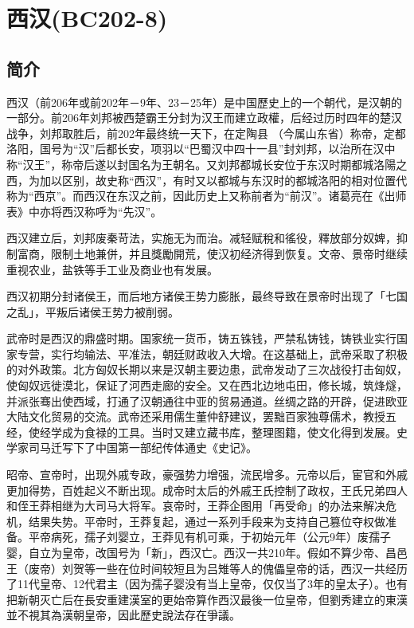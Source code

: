 
\chapter{西汉\tiny(BC202-8)}

\section{简介}


西汉（前206年或前202年－9年、23－25年）是中国歷史上的一个朝代，是汉朝的一部分。前206年刘邦被西楚霸王分封为汉王而建立政權，后经过历时四年的楚汉战争，刘邦取胜后，前202年最终统一天下，在定陶县 （今属山东省）称帝，定都洛阳，国号为“汉”后都长安，项羽以“巴蜀汉中四十一县”封刘邦，以治所在汉中称“汉王”，称帝后遂以封国名为王朝名。又刘邦都城长安位于东汉时期都城洛陽之西，为加以区别，故史称“西汉”，有时又以都城与东汉时的都城洛阳的相对位置代称为“西京”。而西汉在东汉之前，因此历史上又称前者为“前汉”。诸葛亮在《出师表》中亦将西汉称呼为“先汉”。

西汉建立后，刘邦废秦苛法，实施无为而治。减轻赋稅和徭役，釋放部分奴婢，抑制富商，限制土地兼併，并且獎勵開荒，使汉初经济得到恢复。文帝、景帝时继续重视农业，盐铁等手工业及商业也有发展。

西汉初期分封诸侯王，而后地方诸侯王势力膨胀，最终导致在景帝时出现了「七国之乱」，平叛后诸侯王势力被削弱。

武帝时是西汉的鼎盛时期。国家统一货币，铸五铢钱，严禁私铸钱，铸铁业实行国家专营，实行均输法、平准法，朝廷财政收入大增。在这基础上，武帝采取了积极的对外政策。北方匈奴长期以来是汉朝主要边患，武帝发动了三次战役打击匈奴，使匈奴远徙漠北，保证了河西走廊的安全。又在西北边地屯田，修长城，筑烽燧，并派张骞出使西域，打通了汉朝通往中亚的贸易通道。丝绸之路的开辟，促进欧亚大陆文化贸易的交流。武帝还采用儒生董仲舒建议，罢黜百家独尊儒术，教授五经，使经学成为食禄的工具。当时又建立藏书库，整理图籍，使文化得到发展。史学家司马迁写下了中国第一部纪传体通史《史记》。

昭帝、宣帝时，出现外戚专政，豪强势力增强，流民增多。元帝以后，宦官和外戚更加得势，百姓起义不断出现。成帝时太后的外戚王氏控制了政权，王氏兄弟四人和侄王莽相继为大司马大将军。哀帝时，王莽企图用「再受命」的办法来解决危机，结果失势。平帝时，王莽复起，通过一系列手段来为支持自己篡位夺权做准备。平帝病死，孺子刘婴立，王莽见有机可乘，于初始元年（公元9年）废孺子婴，自立为皇帝，改国号为「新」，西汉亡。西汉一共210年。假如不算少帝、昌邑王（废帝）刘贺等一些在位时间较短且为吕雉等人的傀儡皇帝的话，西汉一共经历了11代皇帝、12代君主（因为孺子婴没有当上皇帝，仅仅当了3年的皇太子）。也有把新朝灭亡后在長安重建漢室的更始帝算作西汉最後一位皇帝，但劉秀建立的東漢並不視其為漢朝皇帝，因此歷史說法存在爭議。

